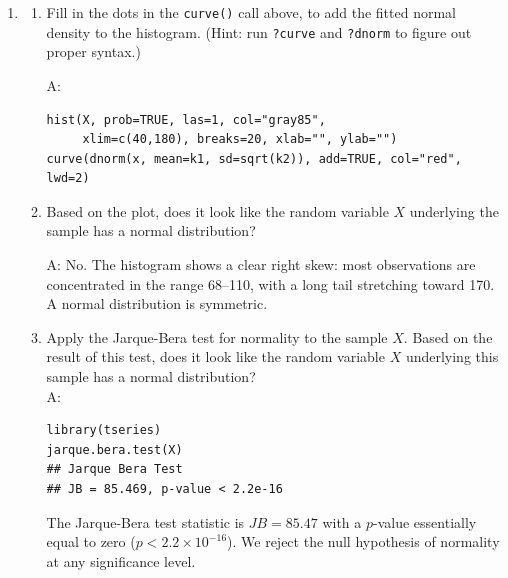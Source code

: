 \documentclass{article}
\begin{document}
\begin{enumerate}
  \item[$\boldsymbol{Q_1}$]
    \begin{enumerate}
      \item[(a)] Fill in the dots in the \texttt{curve()} call above, to add the fitted normal density to the histogram. (Hint: run \texttt{?curve} and \texttt{?dnorm} to figure out proper syntax.)

      A:
\begin{lstlisting}
hist(X, prob=TRUE, las=1, col="gray85",
     xlim=c(40,180), breaks=20, xlab="", ylab="")
curve(dnorm(x, mean=k1, sd=sqrt(k2)), add=TRUE, col="red", lwd=2)
\end{lstlisting}
      \item[(b)] Based on the plot, does it look like the random variable $X$ underlying the sample has a normal distribution?

      A: No. The histogram shows a clear right skew: most observations are concentrated in the range 68--110, with a long tail stretching toward 170. A normal distribution is symmetric.

      \item[(c)] Apply the Jarque-Bera test for normality to the sample $X$. Based on the result of this test, does it look like the random variable $X$ underlying this sample has a normal distribution? \\
      A:

\begin{lstlisting}
library(tseries)
jarque.bera.test(X)
## Jarque Bera Test
## JB = 85.469, p-value < 2.2e-16
\end{lstlisting}

      The Jarque-Bera test statistic is $JB = 85.47$ with a $p$-value essentially equal to zero ($p < 2.2 \times 10^{-16}$). We reject the null hypothesis of normality at any significance level.
    \end{enumerate}
\end{enumerate}
\newpage

\end{document}
